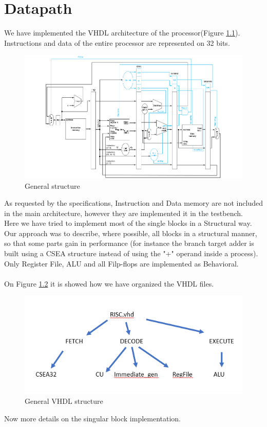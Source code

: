 \chapter{Datapath}
We have implemented the VHDL architecture of the processor(Figure \ref{fig2.1}).
Instructions and data of the entire processor are represented on 32 bits. 
\begin{figure}[h!]
	\centering
	\includegraphics[width=18cm]{./images/structure}
	\caption{General structure}
	\label{fig2.1}
\end{figure}
As requested by the specifications, Instruction and Data memory are not included in the main architecture, however they are implemented it in the testbench.\\
Here we have tried to implement most of the single blocks in a Structural way. \\
Our approach was to describe, where possible, all blocks in a structural manner, so that some parts gain in performance (for instance the branch target adder is built using a CSEA structure instead of using the "+" operand inside a process).
Only Register File, ALU and all Filp-flops are implemented as Behavioral.\\
\\
On Figure \ref{fig2.2} it is showed how we have organized the VHDL files.
\begin{figure}[h!]
	\centering
	\includegraphics[width=15cm]{./images/VHDL_structure}
	\caption{General VHDL structure}
	\label{fig2.2}
\end{figure}
Now more details on the singular block implementation.
